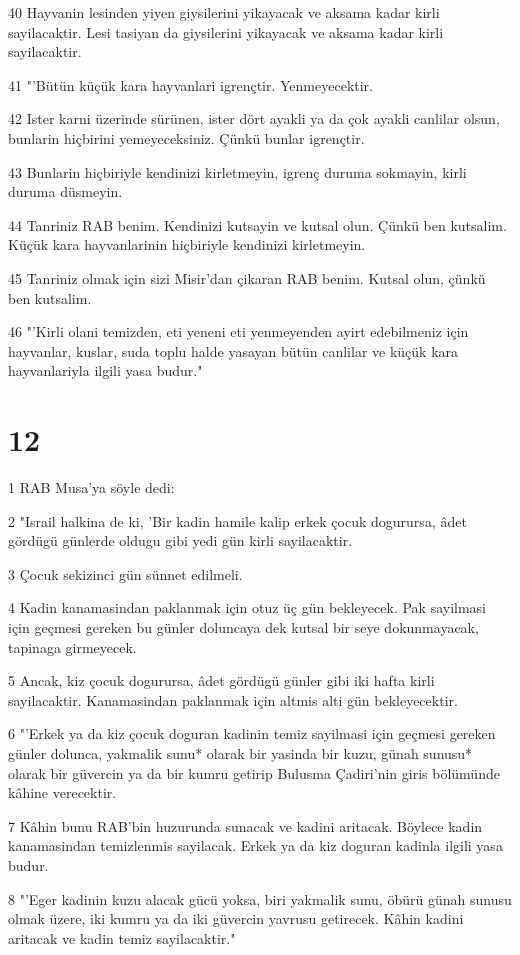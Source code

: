 \par 40 Hayvanin lesinden yiyen giysilerini yikayacak ve aksama kadar kirli sayilacaktir. Lesi tasiyan da giysilerini yikayacak ve aksama kadar kirli sayilacaktir.
\par 41 "'Bütün küçük kara hayvanlari igrençtir. Yenmeyecektir.
\par 42 Ister karni üzerinde sürünen, ister dört ayakli ya da çok ayakli canlilar olsun, bunlarin hiçbirini yemeyeceksiniz. Çünkü bunlar igrençtir.
\par 43 Bunlarin hiçbiriyle kendinizi kirletmeyin, igrenç duruma sokmayin, kirli duruma düsmeyin.
\par 44 Tanriniz RAB benim. Kendinizi kutsayin ve kutsal olun. Çünkü ben kutsalim. Küçük kara hayvanlarinin hiçbiriyle kendinizi kirletmeyin.
\par 45 Tanriniz olmak için sizi Misir'dan çikaran RAB benim. Kutsal olun, çünkü ben kutsalim.
\par 46 "'Kirli olani temizden, eti yeneni eti yenmeyenden ayirt edebilmeniz için hayvanlar, kuslar, suda toplu halde yasayan bütün canlilar ve küçük kara hayvanlariyla ilgili yasa budur."

\chapter{12}

\par 1 RAB Musa'ya söyle dedi:
\par 2 "Israil halkina de ki, 'Bir kadin hamile kalip erkek çocuk dogurursa, âdet gördügü günlerde oldugu gibi yedi gün kirli sayilacaktir.
\par 3 Çocuk sekizinci gün sünnet edilmeli.
\par 4 Kadin kanamasindan paklanmak için otuz üç gün bekleyecek. Pak sayilmasi için geçmesi gereken bu günler doluncaya dek kutsal bir seye dokunmayacak, tapinaga girmeyecek.
\par 5 Ancak, kiz çocuk dogurursa, âdet gördügü günler gibi iki hafta kirli sayilacaktir. Kanamasindan paklanmak için altmis alti gün bekleyecektir.
\par 6 "'Erkek ya da kiz çocuk doguran kadinin temiz sayilmasi için geçmesi gereken günler dolunca, yakmalik sunu* olarak bir yasinda bir kuzu, günah sunusu* olarak bir güvercin ya da bir kumru getirip Bulusma Çadiri'nin giris bölümünde kâhine verecektir.
\par 7 Kâhin bunu RAB'bin huzurunda sunacak ve kadini aritacak. Böylece kadin kanamasindan temizlenmis sayilacak. Erkek ya da kiz doguran kadinla ilgili yasa budur.
\par 8 "'Eger kadinin kuzu alacak gücü yoksa, biri yakmalik sunu, öbürü günah sunusu olmak üzere, iki kumru ya da iki güvercin yavrusu getirecek. Kâhin kadini aritacak ve kadin temiz sayilacaktir."

